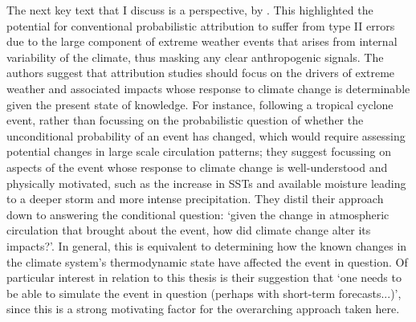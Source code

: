     The next key text that I discuss is a perspective,  by \citet{trenberth_attribution_2015}. This highlighted the potential for conventional probabilistic attribution to suffer from type II errors due to the large component of extreme weather events that arises from internal variability of the climate, thus masking any clear anthropogenic signals. The authors suggest that attribution studies should focus on the drivers of extreme weather and associated impacts whose response to climate change is determinable given the present state of knowledge. For instance, following a tropical cyclone event, rather than focussing on the probabilistic question of whether the unconditional probability of an event has changed, which would require assessing potential changes in large scale circulation patterns; they suggest focussing on aspects of the event whose response to climate change is well-understood and physically motivated, such as the increase in SSTs and available moisture leading to a deeper storm and more intense precipitation. They distil their approach down to answering the conditional question: `given the change in atmospheric circulation that brought about the event, how did climate change alter its impacts?'. In general, this is equivalent to determining how the known changes in the climate system's thermodynamic state have affected the event in question. Of particular interest in relation to this thesis is their suggestion that `one needs to be able to simulate the event in question (perhaps with short-term forecasts...)', since this is a strong motivating factor for the overarching approach taken here.

